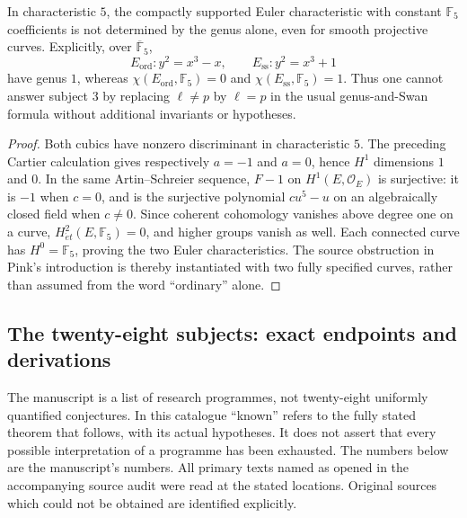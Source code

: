 \begin{corollary}\label{B:p-Euler}
In characteristic $5$, the compactly supported Euler characteristic with constant $\mathbb F_5$ coefficients is not determined by the genus alone, even for smooth projective curves. Explicitly, over $\overline{\mathbb F}_5$,
\[
 E_{\mathrm{ord}}:y^2=x^3-x,
 \qquad E_{\mathrm{ss}}:y^2=x^3+1
\]
have genus $1$, whereas $\chi(E_{\mathrm{ord}},\mathbb F_5)=0$ and $\chi(E_{\mathrm{ss}},\mathbb F_5)=1$. Thus one cannot answer subject 3 by replacing $\ell\ne p$ by $\ell=p$ in the usual genus-and-Swan formula without additional invariants or hypotheses.
\end{corollary}
\begin{proof}
Both cubics have nonzero discriminant in characteristic $5$. The preceding Cartier calculation gives respectively $a=-1$ and $a=0$, hence $H^1$ dimensions $1$ and $0$. In the same Artin--Schreier sequence, $F-1$ on $H^1(E,\mathcal O_E)$ is surjective: it is $-1$ when $c=0$, and is the surjective polynomial $cu^5-u$ on an algebraically closed field when $c\ne0$. Since coherent cohomology vanishes above degree one on a curve, $H^2_{\acute et}(E,\mathbb F_5)=0$, and higher groups vanish as well. Each connected curve has $H^0=\mathbb F_5$, proving the two Euler characteristics. The source obstruction in Pink's introduction is thereby instantiated with two fully specified curves, rather than assumed from the word ``ordinary'' alone.
\end{proof}

\subsection{The twenty-eight subjects: exact endpoints and derivations}
\label{B:catalogue}

The manuscript is a list of research programmes, not twenty-eight uniformly quantified conjectures. In this catalogue ``known'' refers to the fully stated theorem that follows, with its actual hypotheses. It does not assert that every possible interpretation of a programme has been exhausted. The numbers below are the manuscript's numbers. All primary texts named as opened in the accompanying source audit were read at the stated locations. Original sources which could not be obtained are identified explicitly.

